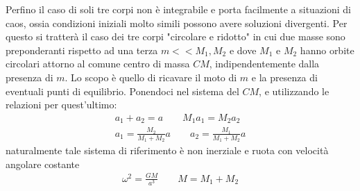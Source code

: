 \documentclass[a4paper, oneside]{book}
\begin{document}
Perfino il caso di soli tre corpi non è integrabile e porta facilmente a situazioni di caos, 
ossia condizioni iniziali molto simili possono avere soluzioni divergenti. Per questo 
si tratterà il caso dei tre corpi "circolare e ridotto" in cui
due masse sono preponderanti rispetto ad una terza $m << M_1, M_2$ e 
dove $M_1$ e $M_2$ hanno orbite circolari attorno al comune centro di massa $CM$, 
indipendentemente dalla presenza di $m$. 
Lo scopo è quello di ricavare il moto di $m$ e la presenza di eventuali punti di equilibrio. 
Ponendoci nel sistema del $CM$, e utilizzando le relazioni per quest'ultimo:
\begin{gather*}
    a_1 + a_2 = a \qquad M_1 a_1 = M_2 a_2 \\
    a_1 = \frac{M_2}{M_1 + M_2}a \qquad a_2 = \frac{M_1}{M_1 + M_2} a
\end{gather*}
naturalmente tale sistema di riferimento è non inerziale e ruota con 
velocità angolare costante 
\begin{gather*}
    \omega^{2} = \frac{GM}{a^{3}} \qquad M = M_1 + M_2
\end{gather*}
\end{document}
